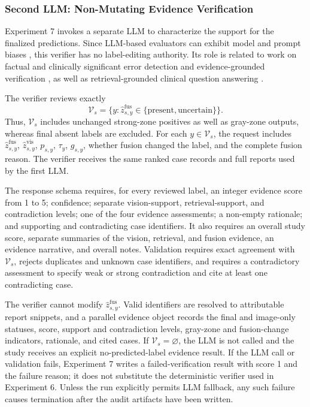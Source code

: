 \subsubsection{Second LLM: Non-Mutating Evidence Verification}

Experiment 7 invokes a separate LLM to characterize the support for the finalized predictions. Since LLM-based evaluators can exhibit model and prompt biases \cite{zheng2023judging}, this verifier has no label-editing authority. Its role is related to work on factual and clinically significant error detection and evidence-grounded verification \cite{ostmeier2024green,gao2023rarr,min2023factscore,dhuliawala2024chain}, as well as retrieval-grounded clinical question answering \cite{zakka2024almanac}.

The verifier reviews exactly
\[
\mathcal V_s=
\{y:\widehat z^{\mathrm{fus}}_{s,y}\in
\{\mathrm{present},\mathrm{uncertain}\}\}.
\]
Thus, $\mathcal V_s$ includes unchanged strong-zone positives as well as gray-zone outputs, whereas final absent labels are excluded. For each $y\in\mathcal V_s$, the request includes $\widehat z^{\mathrm{fus}}_{s,y}$, $\widehat z^{\mathrm{vis}}_{s,y}$, $p_{s,y}$, $\tau_y$, $g_{s,y}$, whether fusion changed the label, and the complete fusion reason. The verifier receives the same ranked case records and full reports used by the first LLM.

The response schema requires, for every reviewed label, an integer evidence score from 1 to 5; confidence; separate vision-support, retrieval-support, and contradiction levels; one of the four evidence assessments; a non-empty rationale; and supporting and contradicting case identifiers. It also requires an overall study score, separate summaries of the vision, retrieval, and fusion evidence, an evidence narrative, and overall notes. Validation requires exact agreement with $\mathcal V_s$, rejects duplicates and unknown case identifiers, and requires a contradictory assessment to specify weak or strong contradiction and cite at least one contradicting case.

The verifier cannot modify $\widehat z^{\mathrm{fus}}_{s,y}$. Valid identifiers are resolved to attributable report snippets, and a parallel evidence object records the final and image-only statuses, score, support and contradiction levels, gray-zone and fusion-change indicators, rationale, and cited cases. If $\mathcal V_s=\varnothing$, the LLM is not called and the study receives an explicit no-predicted-label evidence result. If the LLM call or validation fails, Experiment 7 writes a failed-verification result with score 1 and the failure reason; it does not substitute the deterministic verifier used in Experiment 6. Unless the run explicitly permits LLM fallback, any such failure causes termination after the audit artifacts have been written.

